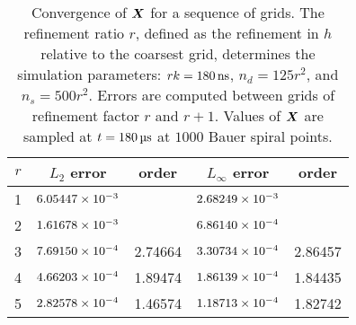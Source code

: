 \begin{table}[tbp]
    \centering
    \caption[Convergence of surface positions for relaxing RBC test]{%
Convergence of $\boldsymbol{X}$ for a sequence of grids. The refinement ratio $r$, defined as the
refinement in $h$ relative to the coarsest grid, determines the simulation parameters:
$r\timestep = 180\ns$, $n_d = 125r^2$, and $n_s = 500r^2$. Errors are computed between
grids of refinement factor $r$ and $r+1$. Values of $\boldsymbol{X}$ are sampled at $t = 180\us$ at
$1000$ Bauer spiral points.
    }\label{tab:x-rbc-conv}
    \begingroup
    \setlength{\tabcolsep}{9pt}
    \renewcommand{\arraystretch}{1.5}
    \begin{tabular}{c|cc|cc}
                                                                                     \toprule
        $r$ & $L_2$ error            & order   & $L_\infty$ error       & order   \\ \midrule
        1   & ${6.05447}\times 10^{-3}$ &         & ${2.68249}\times 10^{-3}$ &         \\
        2   & ${1.61678}\times 10^{-3}$ &         & ${6.86140}\times 10^{-4}$ &         \\
        3   & ${7.69150}\times 10^{-4}$ & 2.74664 & ${3.30734}\times 10^{-4}$ & 2.86457 \\
        4   & ${4.66203}\times 10^{-4}$ & 1.89474 & ${1.86139}\times 10^{-4}$ & 1.84435 \\
        5   & ${2.82578}\times 10^{-4}$ & 1.46574 & ${1.18713}\times 10^{-4}$ & 1.82742 \\ \bottomrule
    \end{tabular}
    \endgroup
\end{table}
